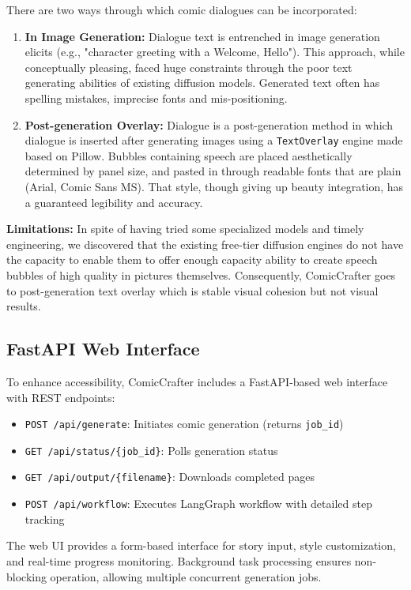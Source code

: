 \documentclass[runningheads]{llncs}
\begin{document}
There are two ways through which comic dialogues can be incorporated:
\begin{enumerate}
\item \textbf{In Image Generation:} Dialogue text is entrenched in image generation elicits (e.g., "character greeting with a Welcome, Hello"). This approach, while conceptually pleasing, faced huge constraints through the poor text generating abilities of existing diffusion models. Generated text often has spelling mistakes, imprecise fonts and mis-positioning.
\item \textbf{Post-generation Overlay:} Dialogue is a post-generation method in which dialogue is inserted after generating images using a \texttt{TextOverlay} engine made based on Pillow. Bubbles containing speech are placed aesthetically determined by panel size, and pasted in through readable fonts that are plain (Arial, Comic Sans MS). That style, though giving up beauty integration, has a guaranteed legibility and accuracy.
\end{enumerate}

\textbf{Limitations:} In spite of having tried some specialized models and timely engineering, we discovered that the existing free-tier diffusion engines do not have the capacity to enable them to offer enough capacity ability to create speech bubbles of high quality in pictures themselves. Consequently, ComicCrafter goes to post-generation text overlay which is stable visual cohesion but not visual results.

\subsection{FastAPI Web Interface}

To enhance accessibility, ComicCrafter includes a FastAPI-based web interface with REST endpoints:
\begin{itemize}
\item \texttt{POST /api/generate}: Initiates comic generation (returns \texttt{job\_id})
\item \texttt{GET /api/status/\{job\_id\}}: Polls generation status
\item \texttt{GET /api/output/\{filename\}}: Downloads completed pages
\item \texttt{POST /api/workflow}: Executes LangGraph workflow with detailed step tracking
\end{itemize}

The web UI provides a form-based interface for story input, style customization, and real-time progress monitoring. Background task processing ensures non-blocking operation, allowing multiple concurrent generation jobs.
\end{document}
